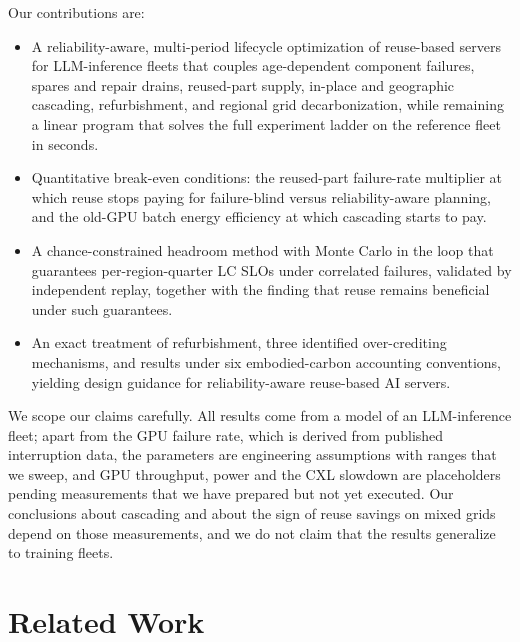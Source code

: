 \documentclass{article} %
\begin{document}
Our contributions are:
\begin{itemize}
    \item A reliability-aware, multi-period lifecycle optimization of reuse-based servers for LLM-inference fleets that couples age-dependent component failures, spares and repair drains, reused-part supply, in-place and geographic cascading, refurbishment, and regional grid decarbonization, while remaining a linear program that solves the full experiment ladder on the reference fleet in seconds.
    \item Quantitative break-even conditions: the reused-part failure-rate multiplier at which reuse stops paying for failure-blind versus reliability-aware planning, and the old-GPU batch energy efficiency at which cascading starts to pay.
    \item A chance-constrained headroom method with Monte Carlo in the loop that guarantees per-region-quarter LC SLOs under correlated failures, validated by independent replay, together with the finding that reuse remains beneficial under such guarantees.
    \item An exact treatment of refurbishment, three identified over-crediting mechanisms, and results under six embodied-carbon accounting conventions, yielding design guidance for reliability-aware reuse-based AI servers.
\end{itemize}

We scope our claims carefully. All results come from a model of an LLM-inference fleet; apart from the GPU failure rate, which is derived from published interruption data, the parameters are engineering assumptions with ranges that we sweep, and GPU throughput, power and the CXL slowdown are placeholders pending measurements that we have prepared but not yet executed. Our conclusions about cascading and about the sign of reuse savings on mixed grids depend on those measurements, and we do not claim that the results generalize to training fleets.

\section{Related Work}
\label{sec:related_work}
\end{document}
